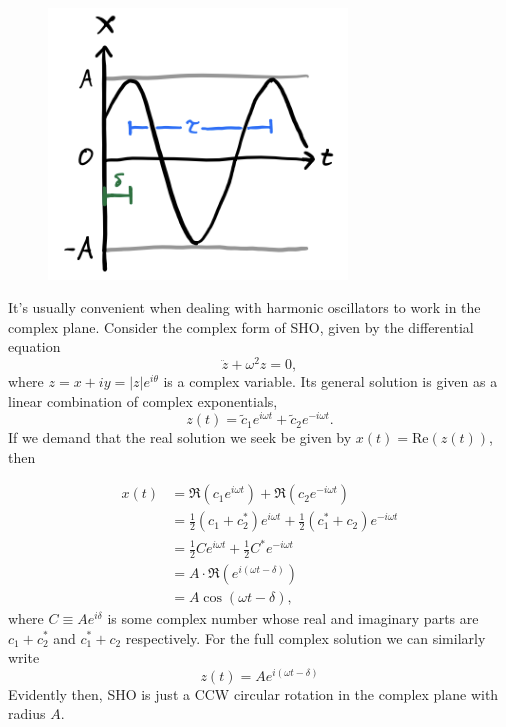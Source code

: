 \documentclass[
  letterpaper,
  DIV=11,
  numbers=noendperiod]{scrreprt}
\begin{document}
\begin{figure}

{\centering \includegraphics[width=3.125in,height=\textheight]{classical-mechanics/./resources/image-20230214060424511.png}

}

\end{figure}

It's usually convenient when dealing with harmonic oscillators to work
in the complex plane. Consider the complex form of SHO, given by the
differential equation \[
\ddot z + \omega^2 z = 0,
\] where \(z = x+iy = |z|e^{i\theta}\) is a complex variable. Its
general solution is given as a linear combination of complex
exponentials, \[
z(t) = \tilde c_1 e^{i\omega t} + \tilde c_2 e^{-i\omega t}.
\] If we demand that the real solution we seek be given by
\(x(t) = \text{Re}(z(t))\), then

\[
\begin{align*}
x(t) &= \Re(c_1 e^{i \omega t}) + \Re(c_2 e^{-i \omega t}) \\
&= \frac{1}{2}(c_1 + c_2^*)e^{i \omega t} + \frac{1}{2}(c_1^* + c_2)e^{-i \omega t} \\
&= \frac{1}{2} C e^{i \omega t} + \frac{1}{2} C^* e^{-i \omega t} \\
&= A \cdot \Re(e^{i(\omega t - \delta)}) \\
&= A \cos(\omega t - \delta),
\end{align*}
\] where \(C \equiv Ae^{i \delta}\) is some complex number whose real
and imaginary parts are \(c_1+c_2^*\) and \(c_1^*+c_2\) respectively.
For the full complex solution we can similarly write \[
z(t) = A e^{i(\omega t - \delta)}
\] Evidently then, SHO is just a CCW circular rotation in the complex
plane with radius \(A\).
\end{document}
